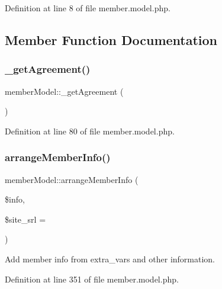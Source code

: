 Definition at line 8 of file member.\+model.\+php.



\subsection{Member Function Documentation}
\hypertarget{classmemberModel_a77fb03f9f26568731dfad78b0b1572dd}{}\label{classmemberModel_a77fb03f9f26568731dfad78b0b1572dd} 
\subsubsection{\texorpdfstring{\+\_\+get\+Agreement()}{\_getAgreement()}}
{\footnotesize\ttfamily member\+Model\+::\+\_\+get\+Agreement (\begin{DoxyParamCaption}{ }\end{DoxyParamCaption})}



Definition at line 80 of file member.\+model.\+php.

\hypertarget{classmemberModel_ad1420187d8b21fb78de5a5e4b4b47a3a}{}\label{classmemberModel_ad1420187d8b21fb78de5a5e4b4b47a3a} 
\subsubsection{\texorpdfstring{arrange\+Member\+Info()}{arrangeMemberInfo()}}
{\footnotesize\ttfamily member\+Model\+::arrange\+Member\+Info (\begin{DoxyParamCaption}\item[{}]{\$info,  }\item[{}]{\$site\+\_\+srl = {} }\end{DoxyParamCaption})}



Add member info from extra\+\_\+vars and other information. 



Definition at line 351 of file member.\+model.\+php.

\hypertarget{classmemberModel_a5970b2dcba76f9fc910cc3df7de19ac7}{}\label{classmemberModel_a5970b2dcba76f9fc910cc3df7de19ac7} 
